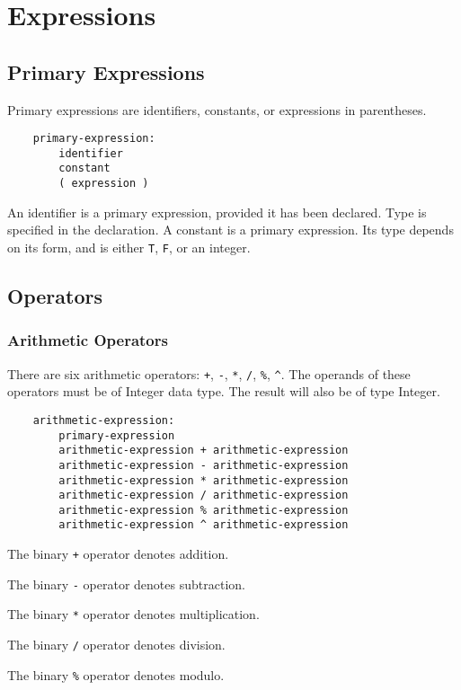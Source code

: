 \documentclass[12pt]{article}
\begin{document}
\section{Expressions}
\subsection{Primary Expressions}
Primary expressions are identifiers, constants, or expressions in parentheses.
\begin{lstlisting}
    primary-expression:
        identifier
        constant
        ( expression )	
\end{lstlisting}
An identifier is a primary expression, provided it has been declared. Type is specified in the declaration.
A constant is a primary expression. Its type depends on its form, and is either \lstinline{T}, \lstinline{F}, or an integer.

\subsection{Operators}
\subsubsection{Arithmetic Operators}
There are six arithmetic operators: \lstinline{+}, \lstinline{-}, \lstinline{*}, \lstinline{/}, \lstinline{%}, \lstinline{^}. The operands of these operators must be of Integer data type. The result will also be of type Integer.

\begin{lstlisting}
    arithmetic-expression:
        primary-expression
        arithmetic-expression + arithmetic-expression
        arithmetic-expression - arithmetic-expression
        arithmetic-expression * arithmetic-expression
        arithmetic-expression / arithmetic-expression
        arithmetic-expression % arithmetic-expression
        arithmetic-expression ^ arithmetic-expression
\end{lstlisting}

The binary \lstinline{+} operator denotes addition.

The binary \lstinline{-} operator denotes subtraction.

The binary \lstinline{*} operator denotes multiplication.

The binary \lstinline{/} operator denotes division.

The binary \lstinline{%} operator denotes modulo.
\end{document}
